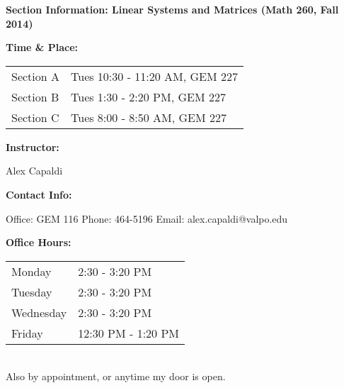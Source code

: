 \documentclass{article}
\theoremstyle{plain}
\theoremstyle{definition}
\theoremstyle{remark}
\begin{document}
\pagestyle{empty}

\begin{center}
\textbf{Section Information: Linear Systems and Matrices (Math 260, Fall 2014)} \\
\end{center}
\vspace{.5cm}

\noindent
\begin{minipage}[t]{1.3in}
	\textbf{Time \& Place:}
\end{minipage}
\begin{minipage}[t]{5.2in}
    \begin{tabular}{ll}
		Section A & Tues 10:30 - 11:20 AM, GEM 227\\
		Section B & Tues 1:30  - 2:20  PM, GEM 227\\
		Section C & Tues 8:00  - 8:50  AM, GEM 227\\
	\end{tabular}
\end{minipage}

\vskip0.2in \noindent
\begin{minipage}[t]{1.3in}
	\textbf{Instructor:}
\end{minipage}
\begin{minipage}[t]{5.2in}
	Alex Capaldi
\end{minipage}

\vskip0.2in \noindent
\begin{minipage}[t]{1.3in}
	\textbf{Contact Info:}
\end{minipage}
\begin{minipage}[t]{5.2in}
	Office: GEM 116
	\newline Phone: 464-5196
	\newline Email: alex.capaldi@valpo.edu
\end{minipage}

\vskip0.2in \noindent
\begin{minipage}[t]{1.3in}
	\textbf{Office Hours:}
\end{minipage}
\begin{minipage}[t]{5.2in}
  \begin{tabular}{ll}
		Monday    & 2:30 - 3:20 PM\\
		Tuesday   & 2:30 - 3:20 PM\\
		Wednesday & 2:30 - 3:20 PM\\
		Friday    & 12:30 PM - 1:20 PM\\
	\end{tabular}
	\\Also by appointment, or anytime my door is open.
\end{minipage}
\end{document}

